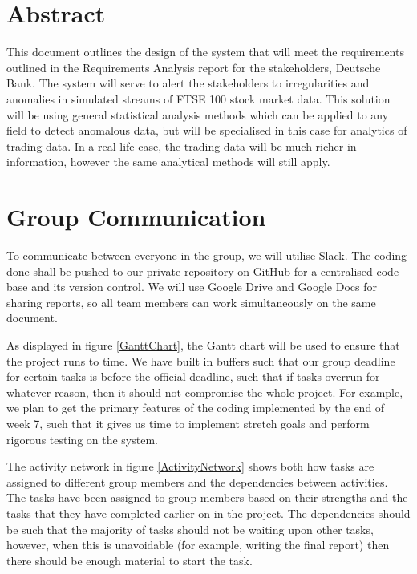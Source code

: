 \documentclass[11pt, oneside, a4paper]{article}
\begin{document}
\clearpage
\maketitle
\thispagestyle{empty}

\newpage
\setcounter{page}{1}

\section{Abstract}

This document outlines the design of the system that will meet the requirements
outlined in the Requirements Analysis report for the stakeholders, Deutsche Bank.
The system will serve to alert the stakeholders to irregularities and anomalies in
simulated streams of FTSE 100 stock market data. This solution will be using general
statistical analysis methods which can be applied to any field to detect anomalous
data, but will be specialised in this case for analytics of trading data. In a real
life case, the trading data will be much richer in information, however the same
analytical methods will still apply.

\section{Group Communication}

To communicate between everyone in the group, we will utilise Slack. The coding
done shall be pushed to our private repository on GitHub for a centralised code
base and its version control. We will use Google Drive and Google Docs for sharing
reports, so all team members can work simultaneously on the same document.

As displayed in figure \ref{GanttChart}, the Gantt chart will be used to ensure
that the project runs to time. We have built in buffers such that our group deadline
for certain tasks is before the official deadline, such that if tasks overrun for
whatever reason, then it should not compromise the whole project. For example, we
plan to get the primary features of the coding implemented by the end of week 7,
such that it gives us time to implement stretch goals and perform rigorous testing
on the system.

The activity network in figure \ref{ActivityNetwork} shows both how tasks are
assigned to different group members and the dependencies between activities. The
tasks have been assigned to group members based on their strengths and the tasks
that they have completed earlier on in the project. The dependencies should be such
that the majority of tasks should not be waiting upon other tasks, however, when
this is unavoidable (for example, writing the final report) then there should be
enough material to start the task.
\end{document}
